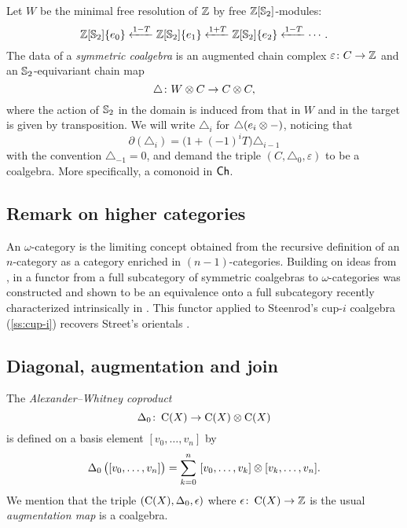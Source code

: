 Let $W$ be the minimal free resolution of $\mathbb{Z}$ by free $\mathbb{Z}[\mathbb{S}_2]$-modules:
\[
\mathbb{Z}[\mathbb{S}_2]\{e_0\} \xleftarrow{1-T} \mathbb{Z}[\mathbb{S}_2]\{e_1\} \xleftarrow{1+T} \mathbb{Z}[\mathbb{S}_2]\{e_2\} \xleftarrow{1-T} \dotsb.
\]
The data of a \textit{symmetric coalgebra} is an augmented chain complex $\varepsilon \colon C \to \mathbb{Z}$ and an $\mathbb{S}_2$-equivariant chain map
\[
\triangle \colon W \otimes C \to C \otimes C,
\]
where the action of $\mathbb{S}_2$ in the domain is induced from that in $W$ and in the target is given by transposition.
We will write $\triangle_i$ for $\triangle(e_i \otimes -)$, noticing that
\[
\partial(\triangle_i) = \big( 1+(-1)^i T \big) \triangle_{i-1}
\]
with the convention $\triangle_{-1} = 0$, and demand the triple $(C, \triangle_0, \varepsilon)$ to be a coalgebra.
More specifically, a comonoid in $\mathsf{Ch}$.

\subsection{Remark on higher categories}
\label{ss:higher categories}

An $\omega$-category is the limiting concept obtained from the recursive definition of an $n$-category as a category enriched in $(n-1)$-categories.
Building on ideas from \cite{brown1981cubes, kapranov1991polycategory, steiner2004omega}, in \cite{medina2020globular} a functor from a full subcategory of symmetric coalgebras to $\omega$-categories was constructed and shown to be an equivalence onto a full subcategory recently characterized intrinsically in \cite{ozornova2022steiner}.
This functor applied to Steenrod's cup-$i$ coalgebra (\cref{ss:cup-i}) recovers Street's orientals \cite{street1987orientals}.

\subsection{Diagonal, augmentation and join}

The \textit{Alexander--Whitney coproduct}
\[
\operatorname{\Delta}_0 \colon \operatorname{C}(X) \to \operatorname{C}(X) \otimes \operatorname{C}(X)
\]
is defined on a basis element $[v_0, \dots, v_n]$ by
\begin{equation*}\label{e:alexander-whitney coalgebra}
	\operatorname{\Delta}_0 \big( [v_0, \dots, v_n] \big) =
	\sum_{k=0}^n \ [v_0, \dots, v_k] \otimes [v_k, \dots, v_n].
\end{equation*}
We mention that the triple $(\operatorname{C}(X), \operatorname{\Delta}_0, \operatorname{\epsilon})$ where $\operatorname{\epsilon} \colon \operatorname{C}(X) \to \mathbb{Z}$ is the usual \textit{augmentation map} is a coalgebra.

